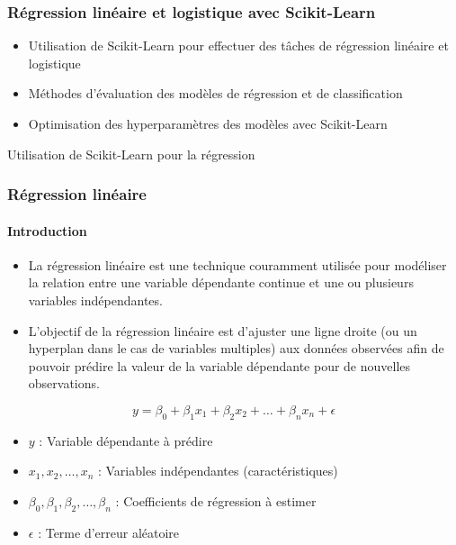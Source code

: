 \documentclass{beamer}
\begin{document}
\begin{frame}
	\frametitle{Régression linéaire et logistique avec Scikit-Learn}
	\begin{itemize}
		\item Utilisation de Scikit-Learn pour effectuer des tâches de régression linéaire et logistique
		\item Méthodes d'évaluation des modèles de régression et de classification
		\item Optimisation des hyperparamètres des modèles avec Scikit-Learn
	\end{itemize}
\end{frame}
{
\begin{frame}{Utilisation de Scikit-Learn pour la régression}
\end{frame}
}

\begin{frame}
	\frametitle{Régression linéaire}
	\framesubtitle{Introduction}
	
	\begin{itemize}
		\item La régression linéaire est une technique couramment utilisée pour modéliser la relation entre une variable dépendante continue et une ou plusieurs variables indépendantes.
		\item L'objectif de la régression linéaire est d'ajuster une ligne droite (ou un hyperplan dans le cas de variables multiples) aux données observées afin de pouvoir prédire la valeur de la variable dépendante pour de nouvelles observations.
	\end{itemize}
	\[
y = \beta_0 + \beta_1x_1 + \beta_2x_2 + \ldots + \beta_nx_n + \epsilon
\]

\begin{itemize}
	\item $y$ : Variable dépendante à prédire
	\item $x_1, x_2, \ldots, x_n$ : Variables indépendantes (caractéristiques)
	\item $\beta_0, \beta_1, \beta_2, \ldots, \beta_n$ : Coefficients de régression à estimer
	\item $\epsilon$ : Terme d'erreur aléatoire
\end{itemize}
\end{frame}
\end{document}
